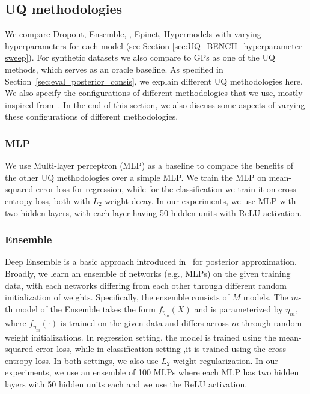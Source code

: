 
\subsection{UQ methodologies}
\label{sec:UQ_bench_benchmark-uq-metric}

We compare Dropout, Ensemble, \ensembleplus, Epinet, Hypermodels with varying  hyperparameters for each model (see Section \ref{sec:UQ_BENCH_hyperparameter-sweep}). 
  For synthetic datasets we also compare to GPs as one of the UQ methods, which serves as an oracle baseline.  As specified in  Section~\ref{sec:eval_posterior_consis}, we explain different UQ methodologies here. We also specify the configurations of different methodologies that we use, mostly inspired from~\citep{OsbandWeAsDwLuIbLaHaDoRo22, OsbandWenAsDwIbLuRo23}. In the end of this section, we also discuss some aspects of varying these configurations of different methodologies.


\subsubsection{MLP}

We use Multi-layer perceptron (MLP) as a baseline to compare the benefits of the other UQ methodologies over a simple MLP.  We train the MLP on mean-squared error loss for regression, while for the classification we train it on cross-entropy loss, both with $L_2$ weight decay. In our experiments, we use  MLP with two hidden layers, with each layer having 50 hidden units with ReLU activation.

  \subsubsection{Ensemble}
Deep Ensemble is a basic approach introduced in~\citep{LakshminarayananPrBl17} for posterior approximation. 
Broadly, we learn an ensemble of networks (e.g., MLPs) on the given training data,  with each networks differing from each other through  different random initialization of weights. Specifically, the ensemble consists of $M$ models.  The $m$-th model of the Ensemble takes the form  $f_{\eta_m}(X)$ and is parameterized by $\eta_m$,
where $f_{\eta_m}(\cdot)$  is   trained on the given data and differs across $m$ through random weight initializations. In regression setting, the model is trained using the mean-squared error loss, while in classification setting ,it is trained using the cross-entropy loss. In both settings, we also use $L_2$ weight regularization. In our experiments, we use an ensemble of 100 MLPs where each MLP has two hidden layers with 50 hidden units each and we use the ReLU activation.

